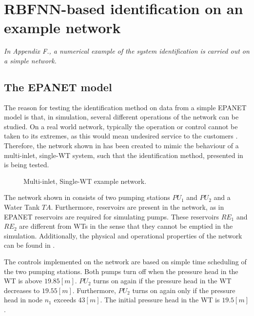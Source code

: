 \chapter{RBFNN-based identification on an example network}
\label{NN_based_example}

\emph{In Appendix F., a numerical example of the system identification is carried out on a simple network.}

\section{The EPANET model}
\label{example1_EPANET}

The reason for testing the identification method on data from a simple EPANET model is that, in simulation, several different operations of the network can be studied. On a real world network, typically the operation or control cannot be taken to its extremes, as this would mean undesired service to the customers . Therefore, the network shown in  has been created to mimic the behaviour of a multi-inlet, single-WT system, such that the identification method, presented in  is being tested. 

\begin{figure}[H]
\centering
 
\caption{Multi-inlet, Single-WT example network.}
\label{fig:epanet_example1_id}
\end{figure}
\vspace{-3mm}

The network shown in  consists of two pumping stations $PU_1$ and $PU_2$ and a Water Tank $TA$. Furthermore, reservoirs are present in the network, as in EPANET reservoirs are required for simulating pumps. These reservoirs $RE_1$ and $RE_2$ are different from WTs in the sense that they cannot be emptied in the simulation. Additionally, the physical and operational properties of the network can be found in . 

The controls implemented on the network are based on simple time scheduling of the two pumping stations. Both pumps turn off when the pressure head in the WT is above $19.85 [m]$. $PU_2$ turns on again if the pressure head in the WT decreases to $19.55 [m]$. Furthermore, $PU_2$ turns on again only if the pressure head in node $n_1$ exceeds $43 [m]$. The initial pressure head in the WT is $19.5 [m]$.

